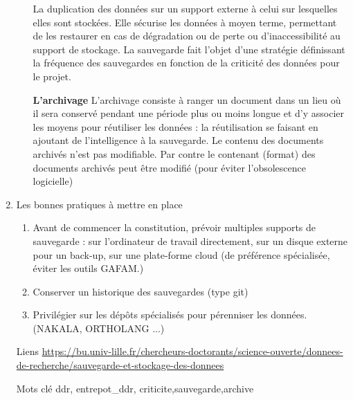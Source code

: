 \documentclass{book}
\begin{document}
\begin{enumerate}
\begin{itemize}
                La duplication des données sur un support externe à celui sur lesquelles elles sont stockées. Elle sécurise les données à moyen terme, permettant de les restaurer en cas de dégradation ou de perte ou d'inaccessibilité au support de stockage. La sauvegarde fait l'objet d'une stratégie définissant la fréquence des sauvegardes en fonction de la criticité des données pour le projet.
                \begin{center}
                \big\downarrow    
                \end{center}
                \item [\textbf{L'archivage}]
                L'archivage  consiste à ranger un document dans un lieu où il sera conservé pendant une période plus ou moins longue et d’y associer les moyens pour réutiliser les données : la réutilisation se faisant en ajoutant de l’intelligence à la sauvegarde. Le contenu des documents archivés n’est pas modifiable. Par contre le contenant (format) des documents archivés peut être modifié (pour éviter l’obsolescence logicielle)   
            \end{itemize}
	\item Les bonnes pratiques à mettre en place
        \begin{enumerate}
            \item Avant de commencer la constitution, prévoir multiples supports de sauvegarde : sur l'ordinateur de travail directement, sur un disque externe pour un back-up, sur une plate-forme cloud (de préférence spécialisée, éviter les outils GAFAM.)
            \item Conserver un historique des sauvegardes (type git)
            \item Privilégier sur les dépôts spécialisés pour pérenniser les données. (NAKALA, ORTHOLANG ...)
        \end{enumerate}
\end{enumerate}

\begin{itemize}
    \item [Liens]
        \autocite{hadrossek:hal-03152732}
        \url{https://bu.univ-lille.fr/chercheurs-doctorants/science-ouverte/donnees-de-recherche/sauvegarde-et-stockage-des-donnees}\\
    \item [Mots clé]
        \gls{ddr}, \gls{entrepot_ddr}, \gls{criticite},\gls{sauvegarde},\gls{archive}
\end{itemize}
\end{document}
